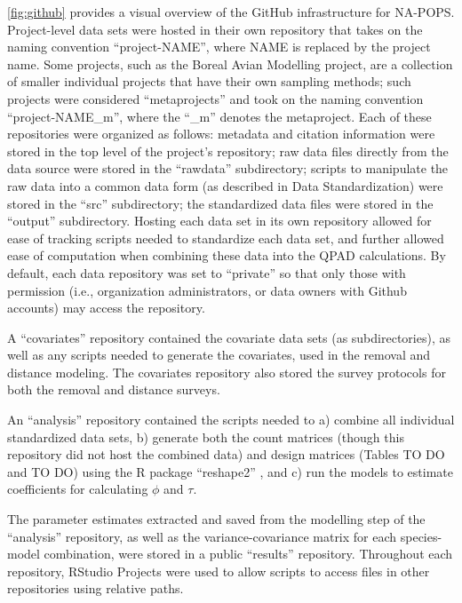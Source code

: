 \par \autoref{fig:github} provides a visual overview of the GitHub infrastructure for NA-POPS. Project-level data sets were hosted in their own repository that takes on the naming convention “project-NAME”, where NAME is replaced by the project name. Some projects, such as the Boreal Avian Modelling project, are a collection of smaller individual projects that have their own sampling methods; such projects were considered “metaprojects” and took on the naming convention “project-NAME\_m”, where the “\_m” denotes the metaproject. Each of these repositories were organized as follows: metadata and citation information were stored in the top level of the project’s repository; raw data files directly from the data source were stored in the “rawdata” subdirectory; scripts to manipulate the raw data into a common data form (as described in Data Standardization) were stored in the “src” subdirectory; the standardized data files were stored in the “output” subdirectory. Hosting each data set in its own repository allowed for ease of tracking scripts needed to standardize each data set, and further allowed ease of computation when combining these data into the QPAD calculations. By default, each data repository was set to “private” so that only those with permission (i.e., organization administrators, or data owners with Github accounts) may access the repository. 

\par A “covariates” repository contained the covariate data sets (as subdirectories), as well as any scripts needed to generate the covariates, used in the removal and distance modeling. The covariates repository also stored the survey protocols for both the removal and distance surveys.

\par An “analysis” repository contained the scripts needed to a) combine all individual standardized data sets, b) generate both the count matrices (though this repository did not host the combined data) and design matrices (Tables TO DO and TO DO) using the R package “reshape2” \citep{wickham_reshaping_2007}, and c) run the models to estimate coefficients for calculating $\phi$ and $\tau$. 

\par The parameter estimates extracted and saved from the modelling step of the “analysis” repository, as well as the variance-covariance matrix for each species-model combination, were stored in a public “results” repository.
Throughout each repository, RStudio Projects were used to allow scripts to access files in other repositories using relative paths.

